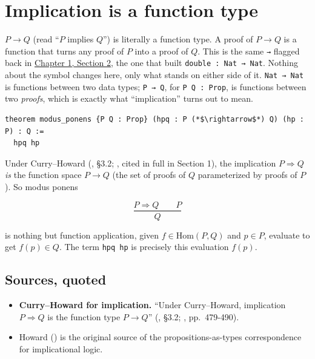 \section{Implication is a function type}\label{sec:04-propositions-and-proofs:04-implication:1}

\(P \to Q\) (read ``\(P\) implies \(Q\)'') is literally a function type. A proof of \(P \to Q\) is a function that turns any proof of \(P\) into a proof of \(Q\). This is the same \texttt{→} flagged back in \hyperref[sec:01-basics:02-def-let-implicit:1]{Chapter 1, Section 2}, the one that built \texttt{double : Nat → Nat}. Nothing about the symbol changes here, only what stands on either side of it. \texttt{Nat → Nat} is functions between two data types; \texttt{P → Q}, for \texttt{P Q : Prop}, is functions between two \emph{proofs}, which is exactly what ``implication'' turns out to mean.

\begin{lstlisting}
theorem modus_ponens {P Q : Prop} (hpq : P (*$\rightarrow$*) Q) (hp : P) : Q :=
  hpq hp
\end{lstlisting}

\begin{mathreading}

Under Curry--Howard (\cite{TPIL4}, §3.2; \cite{Howard1980}, cited in full in Section 1), the implication \(P \Rightarrow
Q\) \emph{is} the function space \(P \to Q\) (the set of proofs of \(Q\) parameterized by proofs of \(P\)). So modus ponens

\end{mathreading}

\[
\frac{P \Rightarrow Q \qquad P}{Q}
\]

is nothing but function application, given \(f \in \mathrm{Hom}(P, Q)\) and \(p \in P\), evaluate to get \(f(p) \in Q\). The term \texttt{hpq hp} is precisely this evaluation \(f(p)\).

\subsection{Sources, quoted}\label{sec:04-propositions-and-proofs:04-implication:2}

\begin{itemize}
\tightlist
\item
  \textbf{Curry--Howard for implication.} ``Under Curry--Howard, implication \(P \Rightarrow Q\) is the function type \(P \to Q\)'' (\cite{TPIL4}, §3.2; \cite{Howard1980}, pp.~479-490).
\item
  Howard (\cite{Howard1980}) is the original source of the propositions-as-types correspondence for implicational logic.
\end{itemize}
